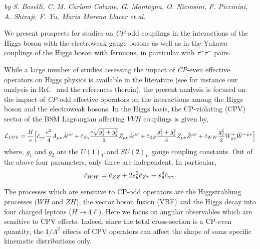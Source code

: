 \begin{center}
\textit{by S. Boselli, C. M. Carloni Calame, G. Montagna,
  O. Nicrosini, F. Piccinini, A. Shivaji, F. Yu, Maria Moreno Llacer
  et al.}
\end{center}

 We present prospects for studies on {\it CP}-odd couplings in the
 interactions of the Higgs boson with the electroweak gauge bosons as well
 as in the Yukawa couplings of the Higgs boson with fermions, in
 particular with $\tau^+ \tau^-$ pairs.
 

While a large number of studies assessing the impact of {\it CP}-even  
effective operators on Higgs physics is available in the literature 
(see for instance our analysis in Ref.~\cite{Boselli:2017pef} and the references therein), 
the present analysis is focused on the impact of {\it CP}-odd effective operators on the 
interactions among the Higgs boson and the electroweak bosons. 
In the Higgs basis, the CP-violating (CPV) sector of the BSM Lagrangian affecting $VVH$ couplings 
is given by, 
% 
\begin{eqnarray}
\mathcal{L}_{\rm CPV} =  \frac{H}{v} \Big[
\tilde c_{\gamma\gamma} \frac{e^2}{4} A_{\mu\nu}\tilde{A}^{\mu\nu}  
+ \tilde c_{Z\gamma} \frac{e\sqrt{g_1^2 + g_2^2}}{2} Z_{\mu\nu}\tilde{A}^{\mu\nu} 
+ \tilde c_{ZZ} \frac{g_1^2 + g_2^2}{4} Z_{\mu\nu}\tilde{Z}^{\mu\nu} + \tilde{c}_{WW} \frac{g_2^2}{2}  W^+_{\mu\nu} \tilde W^{-\mu\nu}\Big]
\label{eqn:Hvv}
\end{eqnarray}  
where, $g_1$ and $g_2$ are the $U(1)_Y$  and  $SU(2)_L$ gauge coupling constants. Out of the above four 
parameters, only three  are independent. In particular,
\begin{equation}
 \tilde c_{WW} = \tilde c_{ZZ} + 2s_\theta^2 \tilde c_{Z\gamma} + s_\theta^4 \tilde c_{\gamma\gamma}.
\end{equation}

The processes which are sensitive to CP-odd operators are the Higgstrahlung processes ($WH$ and $ZH$), the vector boson fusion (VBF) and the Higgs decay into four charged leptons ($H\to4\ell$). Here we focus on angular observables which are sensitive to CPV effects. Indeed, since the total cross-section is a CP-even quantity,  the $1/\Lambda^2$ effects of CPV operators can affect the shape of some specific kinematic distributions only. 



